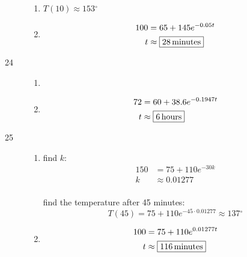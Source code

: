 \documentclass{exam}
\newcommand{\degree}{\ensuremath{^\circ}}
\begin{document}
\begin{description}
\begin{enumerate}[a]
          \item $T(10) \approx \boxed{153 \degree}$

          \item 
            \begin{align*}
              100 & = 65 + 145 e^{-0.05t} \\
              t   & \approx \boxed{\unit[28]{minutes}} \\
            \end{align*}
        \end{enumerate}

      \item[24]
        \begin{enumerate}[a]
          \item {}
            
          \item 
            \begin{align*}
              72 & = 60 + 38.6 e^{-0.1947 t} \\
              t  & \approx \boxed{\unit[6]{hours}} \\
            \end{align*}
        \end{enumerate}

      \pagebreak

      \item[25]
        \begin{enumerate}[a]
          \item find $k$:
            \begin{align*}
              150 & = 75 + 110 e^{-30k} \\
              k   & \approx 0.01277 \\
            \end{align*}

            find the temperature after 45 minutes:
            \[
              T(45) = 75 + 110 e^{-45 \cdot 0.01277} \approx \boxed{137 \degree}
            \]

          \item
            \begin{align*}
              100 & = 75 + 110 e^{0.01277 t} \\
              t   & \approx \boxed{\unit[116]{minutes}} \\
            \end{align*}
        \end{enumerate}


\end{description}
\end{document}
